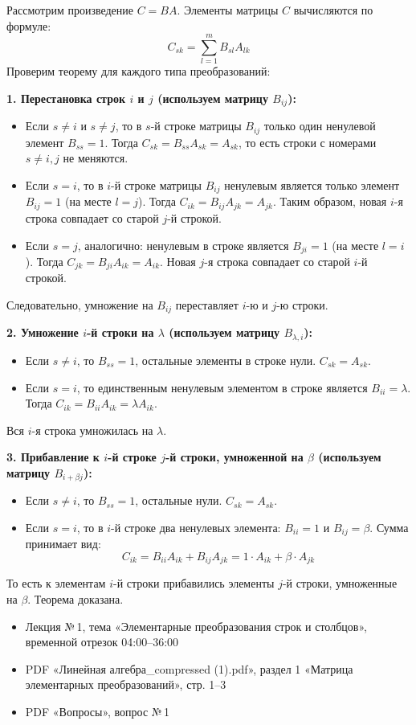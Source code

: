 \begin{tcolorbox}[title=Доказательство, breakable]
Рассмотрим произведение $C = B A$. Элементы матрицы $C$ вычисляются по формуле:
\[ C_{sk} = \sum_{l=1}^m B_{sl} A_{lk} \]
Проверим теорему для каждого типа преобразований:

\textbf{1. Перестановка строк $i$ и $j$ (используем матрицу $B_{ij}$):}
\begin{itemize}
    \item Если $s \neq i$ и $s \neq j$, то в $s$-й строке матрицы $B_{ij}$ только один ненулевой элемент $B_{ss} = 1$. Тогда $C_{sk} = B_{ss} A_{sk} = A_{sk}$, то есть строки с номерами $s \neq i, j$ не меняются.
    \item Если $s = i$, то в $i$-й строке матрицы $B_{ij}$ ненулевым является только элемент $B_{ij} = 1$ (на месте $l=j$). Тогда $C_{ik} = B_{ij} A_{jk} = A_{jk}$. Таким образом, новая $i$-я строка совпадает со старой $j$-й строкой.
    \item Если $s = j$, аналогично: ненулевым в строке является $B_{ji} = 1$ (на месте $l=i$). Тогда $C_{jk} = B_{ji} A_{ik} = A_{ik}$. Новая $j$-я строка совпадает со старой $i$-й строкой.
\end{itemize}
Следовательно, умножение на $B_{ij}$ переставляет $i$-ю и $j$-ю строки.

\textbf{2. Умножение $i$-й строки на $\lambda$ (используем матрицу $B_{\lambda, i}$):}
\begin{itemize}
    \item Если $s \neq i$, то $B_{ss} = 1$, остальные элементы в строке нули. $C_{sk} = A_{sk}$.
    \item Если $s = i$, то единственным ненулевым элементом в строке является $B_{ii} = \lambda$. Тогда $C_{ik} = B_{ii} A_{ik} = \lambda A_{ik}$.
\end{itemize}
Вся $i$-я строка умножилась на $\lambda$.

\textbf{3. Прибавление к $i$-й строке $j$-й строки, умноженной на $\beta$ (используем матрицу $B_{i+\beta j}$):}
\begin{itemize}
    \item Если $s \neq i$, то $B_{ss} = 1$, остальные нули. $C_{sk} = A_{sk}$.
    \item Если $s = i$, то в $i$-й строке два ненулевых элемента: $B_{ii} = 1$ и $B_{ij} = \beta$. Сумма принимает вид:
    \[ C_{ik} = B_{ii} A_{ik} + B_{ij} A_{jk} = 1 \cdot A_{ik} + \beta \cdot A_{jk} \]
\end{itemize}
То есть к элементам $i$-й строки прибавились элементы $j$-й строки, умноженные на $\beta$.
Теорема доказана.
\end{tcolorbox}

\begin{tcolorbox}[title=Источники, colback=gray!10]
\begin{itemize}
  \item Лекция №\,1, тема «Элементарные преобразования строк и столбцов», временной отрезок 04:00--36:00
  \item PDF «Линейная алгебра\_compressed (1).pdf», раздел 1 «Матрица элементарных преобразований», стр. 1--3
  \item PDF «Вопросы», вопрос №\,1
\end{itemize}
\end{tcolorbox}
